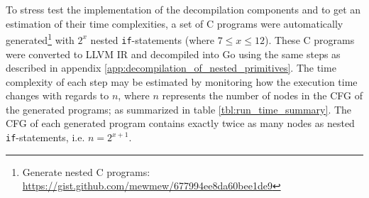 
To stress test the implementation of the decompilation components and to get an estimation of their time complexities, a set of C programs were automatically generated\footnote{Generate nested C programs: \url{https://gist.github.com/mewmew/677994ee8da60bee1de9}} with $ 2^{x} $ nested \texttt{if}-statements (where $ 7 \le x \le 12 $). These C programs were converted to LLVM IR and decompiled into Go using the same steps as described in appendix \ref{app:decompilation_of_nested_primitives}. The time complexity of each step may be estimated by monitoring how the execution time changes with regards to $ n $, where $ n $ represents the number of nodes in the CFG of the generated programs; as summarized in table \ref{tbl:run_time_summary}. The CFG of each generated program contains exactly twice as many nodes as nested \texttt{if}-statements, i.e. $ n = 2^{x+1} $.


